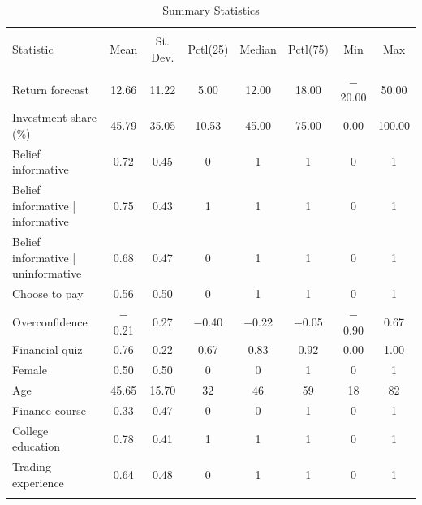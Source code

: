 
\begin{table}[!htbp] \centering 
  \caption{Summary Statistics} 
  \label{} 
\begin{tabular}{@{\extracolsep{5pt}}lccccccc} 
\\[-1.8ex]\hline 
\hline \\[-1.8ex] 
Statistic & \multicolumn{1}{c}{Mean} & \multicolumn{1}{c}{St. Dev.} & \multicolumn{1}{c}{Pctl(25)} & \multicolumn{1}{c}{Median} & \multicolumn{1}{c}{Pctl(75)} & \multicolumn{1}{c}{Min} & \multicolumn{1}{c}{Max} \\ 
\hline \\[-1.8ex] 
Return forecast & 12.66 & 11.22 & 5.00 & 12.00 & 18.00 & $-$20.00 & 50.00 \\ 
Investment share (\%) & 45.79 & 35.05 & 10.53 & 45.00 & 75.00 & 0.00 & 100.00 \\ 
Belief informative & 0.72 & 0.45 & 0 & 1 & 1 & 0 & 1 \\ 
Belief informative | informative & 0.75 & 0.43 & 1 & 1 & 1 & 0 & 1 \\ 
Belief informative | uninformative  & 0.68 & 0.47 & 0 & 1 & 1 & 0 & 1 \\ 
Choose to pay & 0.56 & 0.50 & 0 & 1 & 1 & 0 & 1 \\ 
Overconfidence & $-$0.21 & 0.27 & $-$0.40 & $-$0.22 & $-$0.05 & $-$0.90 & 0.67 \\ 
Financial quiz & 0.76 & 0.22 & 0.67 & 0.83 & 0.92 & 0.00 & 1.00 \\ 
Female & 0.50 & 0.50 & 0 & 0 & 1 & 0 & 1 \\ 
Age & 45.65 & 15.70 & 32 & 46 & 59 & 18 & 82 \\ 
Finance course & 0.33 & 0.47 & 0 & 0 & 1 & 0 & 1 \\ 
College education & 0.78 & 0.41 & 1 & 1 & 1 & 0 & 1 \\ 
Trading experience & 0.64 & 0.48 & 0 & 1 & 1 & 0 & 1 \\ 
\hline \\[-1.8ex] 
\end{tabular} 
\end{table} 
